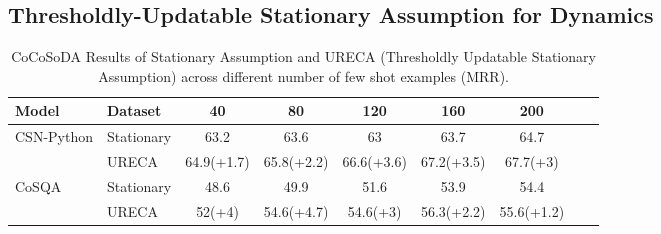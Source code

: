 \newpage
\subsection{Thresholdly-Updatable Stationary Assumption for Dynamics}
\begin{table*}[h]
\def\arraystretch{1.0}
\setlength\tabcolsep{8pt} %
\begin{tabular}{@{}lllcccccc@{}}

\toprule
Model                            & \multicolumn{1}{l}{Dataset}              & \multicolumn{1}{c}{40}           
& \multicolumn{1}{c}{80}         & \multicolumn{1}{c}{120}               & \multicolumn{1}{c}{160}     
& \multicolumn{1}{c}{200}        \\ \midrule

\multirow{2}{*}{CSN-Python} 
& Stationary                & \multicolumn{1}{c}{63.2}          & \multicolumn{1}{c}{63.6}          
                            & \multicolumn{1}{c}{63}          & \multicolumn{1}{c}{63.7}          
                            & \multicolumn{1}{c}{64.7}                   
                            \\ \cmidrule(l){2-7} 
& URECA                     & \multicolumn{1}{c}{64.9(+1.7)}          & \multicolumn{1}{c}{65.8(+2.2)}          
                            & \multicolumn{1}{c}{66.6(+3.6)}          & \multicolumn{1}{c}{67.2(+3.5)}          
                            & \multicolumn{1}{c}{67.7(+3)}                  
                            \\ \midrule

\multirow{2}{*}{CoSQA} 
& Stationary                & \multicolumn{1}{c}{48.6}          & \multicolumn{1}{c}{49.9}          
                            & \multicolumn{1}{c}{51.6}          & \multicolumn{1}{c}{53.9}          
                            & \multicolumn{1}{c}{54.4}                    
                            \\ \cmidrule(l){2-7} 
& URECA                     & \multicolumn{1}{c}{52(+4)}          & \multicolumn{1}{c}{54.6(+4.7)}          
                            & \multicolumn{1}{c}{54.6(+3)}          & \multicolumn{1}{c}{56.3(+2.2)}          
                            & \multicolumn{1}{c}{55.6(+1.2)}                   
                            \\ \bottomrule 
\end{tabular}
\caption{CoCoSoDA Results of Stationary Assumption and URECA (Thresholdly Updatable Stationary Assumption) 
across different number of few shot examples (MRR).}
\label{Stationary Assumption}
\end{table*}


